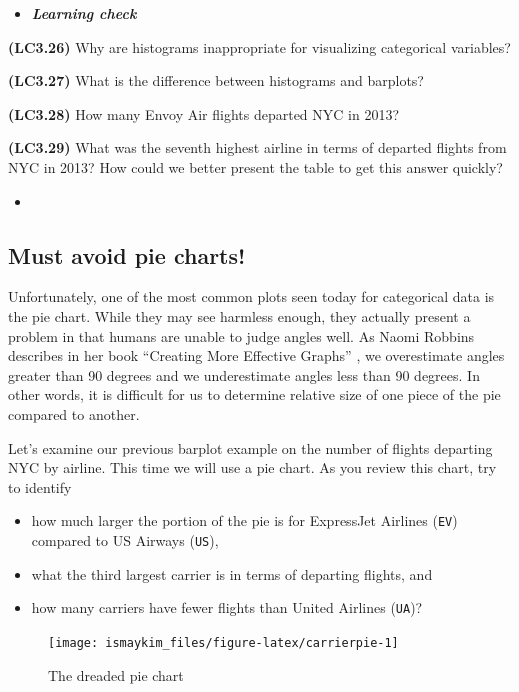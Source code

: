 \documentclass[12pt,]{krantz}
\providecommand{\tightlist}{%
  \setlength{\itemsep}{0pt}\setlength{\parskip}{0pt}}
\newenvironment{rmdblock}[1]
  {\begin{shaded*}
  \begin{itemize}
  \renewcommand{\labelitemi}{
    \raisebox{-.7\height}[0pt][0pt]{
    }
  }
  \item
  }
  {
  \end{itemize}
  \end{shaded*}
  }
\newenvironment{learncheck}
  {\begin{rmdblock}{warning}}
  {\end{rmdblock}}
\begin{document}
\begin{learncheck}
\textbf{\emph{Learning check}}
\end{learncheck}

\textbf{(LC3.26)} Why are histograms inappropriate for visualizing
categorical variables?

\textbf{(LC3.27)} What is the difference between histograms and
barplots?

\textbf{(LC3.28)} How many Envoy Air flights departed NYC in 2013?

\textbf{(LC3.29)} What was the seventh highest airline in terms of
departed flights from NYC in 2013? How could we better present the table
to get this answer quickly?

\begin{learncheck}

\end{learncheck}

\subsection{Must avoid pie charts!}\label{must-avoid-pie-charts}

Unfortunately, one of the most common plots seen today for categorical
data is the pie chart. While they may see harmless enough, they actually
present a problem in that humans are unable to judge angles well. As
Naomi Robbins describes in her book ``Creating More Effective Graphs''
\citep{robbins2013}, we overestimate angles greater than 90 degrees and
we underestimate angles less than 90 degrees. In other words, it is
difficult for us to determine relative size of one piece of the pie
compared to another.

Let's examine our previous barplot example on the number of flights
departing NYC by airline. This time we will use a pie chart. As you
review this chart, try to identify

\begin{itemize}
\tightlist
\item
  how much larger the portion of the pie is for ExpressJet Airlines
  (\texttt{EV}) compared to US Airways (\texttt{US}),
\item
  what the third largest carrier is in terms of departing flights, and
\item
  how many carriers have fewer flights than United Airlines
  (\texttt{UA})?
\end{itemize}

\begin{figure}

{\centering \texttt{[image: ismaykim\_files/figure-latex/carrierpie-1]} 

}

\caption{The dreaded pie chart}\label{fig:carrierpie}
\end{figure}
\end{document}
